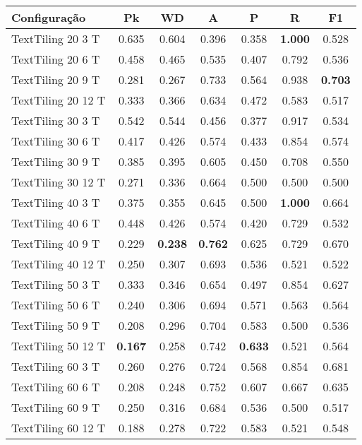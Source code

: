 \documentclass{article}
\begin{document}
 
\begin{tabular}{|l|c|c|c|c|c|c|} 
\hline 
Configuração & \textbf{Pk} & \textbf{WD} & \textbf{A } & \textbf{P } & \textbf{R } & \textbf{F1}\\ \hline
TextTiling 20  3 T & 0.635 & 0.604 & 0.396 & 0.358 & \textbf{1.000} & 0.528\\ \hline
TextTiling 20  6 T & 0.458 & 0.465 & 0.535 & 0.407 & 0.792 & 0.536\\ \hline
TextTiling 20  9 T & 0.281 & 0.267 & 0.733 & 0.564 & 0.938 & \textbf{0.703}\\ \hline
TextTiling 20 12 T & 0.333 & 0.366 & 0.634 & 0.472 & 0.583 & 0.517\\ \hline
TextTiling 30  3 T & 0.542 & 0.544 & 0.456 & 0.377 & 0.917 & 0.534\\ \hline
TextTiling 30  6 T & 0.417 & 0.426 & 0.574 & 0.433 & 0.854 & 0.574\\ \hline
TextTiling 30  9 T & 0.385 & 0.395 & 0.605 & 0.450 & 0.708 & 0.550\\ \hline
TextTiling 30 12 T & 0.271 & 0.336 & 0.664 & 0.500 & 0.500 & 0.500\\ \hline
TextTiling 40  3 T & 0.375 & 0.355 & 0.645 & 0.500 & \textbf{1.000} & 0.664\\ \hline
TextTiling 40  6 T & 0.448 & 0.426 & 0.574 & 0.420 & 0.729 & 0.532\\ \hline
TextTiling 40  9 T & 0.229 & \textbf{0.238} & \textbf{0.762} & 0.625 & 0.729 & 0.670\\ \hline
TextTiling 40 12 T & 0.250 & 0.307 & 0.693 & 0.536 & 0.521 & 0.522\\ \hline
TextTiling 50  3 T & 0.333 & 0.346 & 0.654 & 0.497 & 0.854 & 0.627\\ \hline
TextTiling 50  6 T & 0.240 & 0.306 & 0.694 & 0.571 & 0.563 & 0.564\\ \hline
TextTiling 50  9 T & 0.208 & 0.296 & 0.704 & 0.583 & 0.500 & 0.536\\ \hline
TextTiling 50 12 T & \textbf{0.167} & 0.258 & 0.742 & \textbf{0.633} & 0.521 & 0.564\\ \hline
TextTiling 60  3 T & 0.260 & 0.276 & 0.724 & 0.568 & 0.854 & 0.681\\ \hline
TextTiling 60  6 T & 0.208 & 0.248 & 0.752 & 0.607 & 0.667 & 0.635\\ \hline
TextTiling 60  9 T & 0.250 & 0.316 & 0.684 & 0.536 & 0.500 & 0.517\\ \hline
TextTiling 60 12 T & 0.188 & 0.278 & 0.722 & 0.583 & 0.521 & 0.548\\ \hline

\end{tabular}
\end{document}
